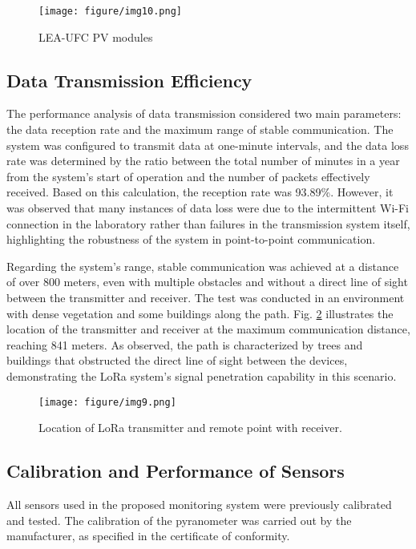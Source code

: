\documentclass{ieeeaccess}
\begin{document}
\begin{figure}[h]
    \centering
    \texttt{[image: figure/img10.png]}
    \caption{LEA-UFC PV modules}
    \label{fig:modulosLEA}
\end{figure}




\subsection{Data Transmission Efficiency} The performance analysis of data transmission considered two main parameters: the data reception rate and the maximum range of stable communication. The system was configured to transmit data at one-minute intervals, and the data loss rate was determined by the ratio between the total number of minutes in a year from the system’s start of operation and the number of packets effectively received. Based on this calculation, the reception rate was 93.89\%. However, it was observed that many instances of data loss were due to the intermittent Wi-Fi connection in the laboratory rather than failures in the transmission system itself, highlighting the robustness of the system in point-to-point communication.

Regarding the system's range, stable communication was achieved at a distance of over 800 meters, even with multiple obstacles and without a direct line of sight between the transmitter and receiver. The test was conducted in an environment with dense vegetation and some buildings along the path. Fig. \ref{fig:mapaLEA} illustrates the location of the transmitter and receiver at the maximum communication distance, reaching 841 meters. As observed, the path is characterized by trees and buildings that obstructed the direct line of sight between the devices, demonstrating the LoRa system’s signal penetration capability in this scenario.

\begin{figure}[h]
    \centering
    \texttt{[image: figure/img9.png]}
    \caption{Location of LoRa transmitter and remote point with receiver.}    
    \label{fig:mapaLEA}
\end{figure}


\subsection{Calibration and Performance of Sensors}  
All sensors used in the proposed monitoring system were previously calibrated and tested. The calibration of the pyranometer was carried out by the manufacturer, as specified in the certificate of conformity.  
\end{document}
